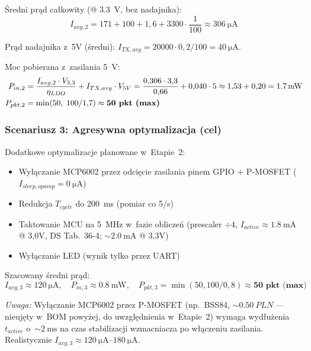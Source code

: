 \documentclass[a4paper,11pt]{article}
\begin{document}
Średni prąd całkowity (@ \SI{3,3}{\volt}, bez nadajnika):
\begin{equation}
    I_{avg,2} = 171 + 100 + 1{,}6 + 3300 \cdot \frac{1}{100}
    \approx \SI{306}{\micro\ampere}
\end{equation}

Prąd nadajnika z~5V (średni): $I_{TX,avg} = 20000 \cdot 0{,}2 / 100 = \SI{40}{\micro\ampere}$.

Moc pobierana z~zasilania \SI{5}{\volt}:
\begin{align}
    P_{in,2} &= \frac{I_{avg,2} \cdot V_{3,3}}{\eta_{LDO}} + I_{TX,avg} \cdot V_{5V}
    = \frac{0{,}306 \cdot 3{,}3}{0{,}66} + 0{,}040 \cdot 5
    \approx 1{,}53 + 0{,}20 = \SI{1,7}{\milli\watt} \label{eq:moc_scen2} \\
    P_{pkt,2} &= \min(50,\; 100/1{,}7) \approx \textbf{50~pkt~(max)} \notag
\end{align}

\subsubsection{Scenariusz 3: Agresywna optymalizacja (cel)}

Dodatkowe optymalizacje planowane w~Etapie~2:
\begin{itemize}[nosep]
    \item Wyłączanie MCP6002 przez odcięcie zasilania pinem GPIO + P-MOSFET
          ($I_{sleep,opamp} = \SI{0}{\micro\ampere}$)
    \item Redukcja $T_{cycle}$ do \SI{200}{\milli\second} (pomiar co 5/s)
    \item Taktowanie MCU na \SI{5}{\mega\hertz} w~fazie obliczeń
          (prescaler $\div 4$, $I_{active} \approx \SI{1,8}{\milli\ampere}$ @ 3{,}0V, DS Tab.~36-4; ${\sim}\SI{2,0}{\milli\ampere}$ @ 3{,}3V)
    \item Wyłączanie LED (wynik tylko przez UART)
\end{itemize}

Szacowany średni prąd:
\begin{equation}
    I_{avg,3} \approx \SI{120}{\micro\ampere}, \quad
    P_{in,3} \approx \SI{0,8}{\milli\watt}, \quad
    P_{pkt,3} = \min(50, 100/0{,}8) \approx \textbf{50~pkt~(max)}
    \label{eq:moc_scen3}
\end{equation}

\textit{Uwaga:} Wyłączanie MCP6002 przez P-MOSFET (np.\ BSS84, ${\sim}\SI{0,50}{PLN}$
--- nieujęty w~BOM powyżej, do uwzględnienia w~Etapie~2) wymaga wydłużenia
$t_{active}$ o~${\sim}\SI{2}{\milli\second}$ na czas stabilizacji wzmacniacza
po włączeniu zasilania. Realistycznie $I_{avg,3} \approx \SIrange{120}{180}{\micro\ampere}$.
\end{document}
